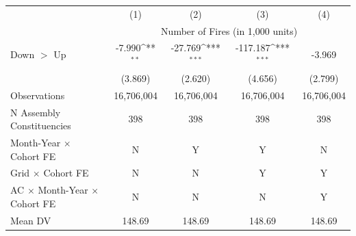 {
\def\sym#1{\ifmmode^{#1}\else\(^{#1}\)\fi}
\begin{tabular}{l*{4}{c}}
\hline
            &\multicolumn{1}{c}{(1)}         &\multicolumn{1}{c}{(2)}         &\multicolumn{1}{c}{(3)}         &\multicolumn{1}{c}{(4)}         \\
            & \multicolumn{4}{c}{Number of Fires (in 1,000 units)} \\ \hline

Down $>$ Up &      -7.990\sym{**} &     -27.769\sym{***}&    -117.187\sym{***}&      -3.969         \\
            &     (3.869)         &     (2.620)         &     (4.656)         &     (2.799)         \\
\hline
Observations&  16,706,004         &  16,706,004         &  16,706,004         &  16,706,004         \\
N Assembly Constituencies&         398         &         398         &         398         &         398         \\
Month-Year $\times$ Cohort FE&           N         &           Y         &           Y         &           N         \\
Grid $\times$ Cohort FE&           N         &           N         &           Y         &           Y         \\
AC $\times$ Month-Year $\times$ Cohort FE&           N         &           N         &           N         &           Y         \\
Mean DV     &      148.69         &      148.69         &      148.69         &      148.69         \\
\hline
\end{tabular}
}
